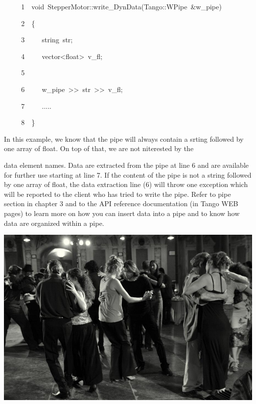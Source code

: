 
\begin{lyxcode}
~~~~~1~~void~StepperMotor::write\_DynData(Tango::WPipe~\&w\_pipe)

~~~~~2~~\{

~~~~~3~~~~~string~str;

~~~~~4~~~~~vector<float>~v\_fl;

~~~~~5

~~~~~6~~~~~w\_pipe~>\textcompwordmark{}>~str~>\textcompwordmark{}>~v\_fl;

~~~~~7~~~~~.....

~~~~~8~~\}
\end{lyxcode}


In this example, we know that the pipe will always contain a srting
followed by one array of float. On top of that, we are not niterested
by the

data element names. Data are extracted from the pipe at line 6 and
are available for further use starting at line 7. If the content of
the pipe is not a string followed by one array of float, the data
extraction line (6) will throw one exception which will be reported
to the client who has tried to write the pipe. Refer to pipe section
in chapter 3 and to the API reference documentation (in Tango WEB
pages) to learn more on how you can insert data into a pipe and to
know how data are organized within a pipe.

\bigskip{}


\begin{center}

\label{BlackPicture}\includegraphics[scale=0.6]{dance/tango-08-39}

\end{center}
